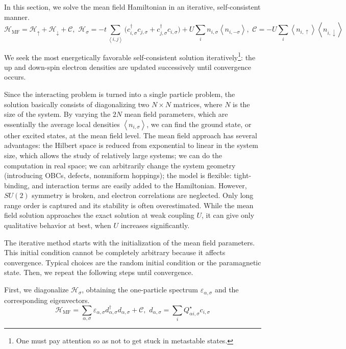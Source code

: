 In this section, we solve the mean field Hamiltonian in an iterative, self-consistent manner.
\begin{equation}
\mathcal{H}_{\text{MF}} = \mathcal{H}_\uparrow + \mathcal{H}_\downarrow + \mathcal{C} , \,\, \mathcal{H}_\sigma = - t \sum_{\left\langle i, j \right\rangle} \bigg( c_{i,\sigma}^\dagger c_{j,\sigma} + c_{j,\sigma}^\dagger c_{i,\sigma} \bigg) + U \sum_i n_{i,\sigma} \left\langle n_{i,-\sigma} \right\rangle , \,\, \mathcal{C} = - U \sum_i \left\langle n_{i,\uparrow} \right\rangle \left\langle n_{i,\downarrow} \right\rangle
\end{equation}

We seek the most energetically favorable self-consistent solution iteratively\footnote{One must pay attention so as not to get stuck in metastable states.}: the up and down-spin electron densities are updated successively until convergence occurs.

Since the interacting problem is turned into a single particle problem, the solution basically consists of diagonalizing two $N \times N$ matrices, where $N$ is the size of the system.
By varying the $2N$ mean field parameters, which are essentially the average local densities $\left\langle n_{i,\sigma} \right\rangle$, we can find the ground state, or other excited states, at the mean field level.
The mean field approach has several advantages: the Hilbert space is reduced from exponential to linear in the system size, which allows the study of relatively large systems; we can do the computation in real space; we can arbitrarily change the system geometry (introducing \acp{OBC}, defects, nonuniform hoppings); the model is flexible: tight-binding, and interaction terms are easily added to the Hamiltonian.
However, $SU(2)$ symmetry is broken, and electron correlations are neglected.
Only long range order is captured and its stability is often overestimated.
While the mean field solution approaches the exact solution at weak coupling $U$, it can give only qualitative behavior at best, when $U$ increases significantly.

The iterative method starts with the initialization of the mean field parameters.
This initial condition cannot be completely arbitrary because it affects convergence.
Typical choices are the random initial condition or the paramagnetic state.
Then, we repeat the following steps until convergence.

First, we diagonalize $\mathcal{H}_\sigma$, obtaining the one-particle spectrum $\varepsilon_{\alpha, \sigma}$ and the corresponding eigenvectors.
\begin{equation}
\mathcal{H}_{\text{MF}} = \sum_{\alpha, \sigma} \varepsilon_{\alpha, \sigma} d_{\alpha, \sigma}^\dagger d_{\alpha, \sigma} + \mathcal{C} , \,\, d_{\alpha, \sigma} = \sum_i Q_{\alpha i, \sigma}^\star c_{i,\sigma}
\end{equation}

